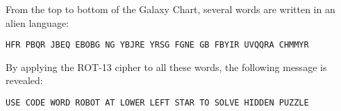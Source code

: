 From the top to bottom of the Galaxy Chart, several words are written in an
alien language:

\texttt{HFR PBQR JBEQ EBOBG NG YBJRE YRSG FGNE GB FBYIR UVQQRA CHMMYR}

By applying the ROT-13 cipher to all these words, the following message
is revealed:

\texttt{USE CODE WORD ROBOT AT LOWER LEFT STAR TO SOLVE HIDDEN PUZZLE}
